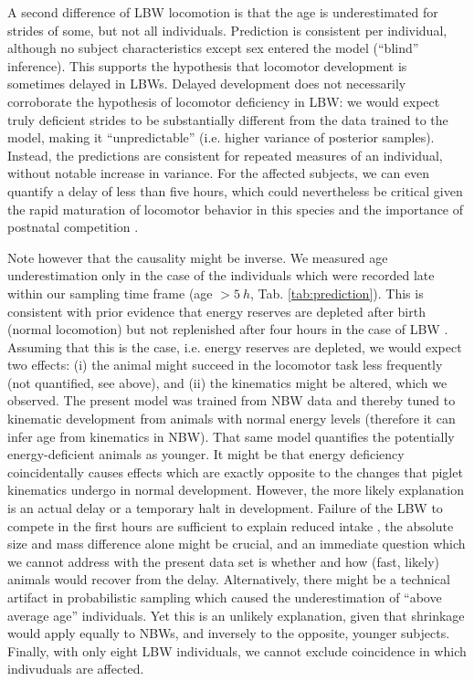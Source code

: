 A second difference of LBW locomotion is that the age is underestimated for strides of some, but not all individuals.
Prediction is consistent per individual, although no subject characteristics except sex entered the model (``blind'' inference).
This supports the hypothesis that locomotor development is sometimes delayed in LBWs.
Delayed development does not necessarily corroborate the hypothesis of locomotor deficiency in LBW: we would expect truly deficient strides to be substantially different from the data trained to the model, making it ``unpredictable'' (i.e. higher variance of posterior samples).
Instead, the predictions are consistent for repeated measures of an individual, without notable increase in variance.
For the affected subjects, we can even quantify a delay of less than five hours, which could nevertheless be critical given the rapid maturation of locomotor behavior in this species \citep{VandenHole2017} and the importance of postnatal competition \citep{Litten2003}.


Note however that the causality might be inverse.
We measured age underestimation only in the case of the individuals which were recorded late within our sampling time frame (age \(> 5\ h\), Tab. \ref{tab:prediction}).
This is consistent with prior evidence that energy reserves are depleted after birth (normal locomotion) but not replenished after four hours in the case of LBW \citep{LeDividich2017,VandenHole2019}.
Assuming that this is the case, i.e. energy reserves are depleted, we would expect two effects: (i) the animal might succeed in the locomotor task less frequently (not quantified, see above), and (ii) the kinematics might be altered, which we observed.
The present model was trained from NBW data and thereby tuned to kinematic development from animals with normal energy levels (therefore it can infer age from kinematics in NBW).
That same model quantifies the potentially energy-deficient animals as younger.
It might be that energy deficiency coincidentally causes effects which are exactly opposite to the changes that piglet kinematics undergo in normal development.
However, the more likely explanation is an actual delay or a temporary halt in development.
Failure of the LBW to compete in the first hours are sufficient to explain reduced intake \citep{Amdi2013}, the absolute size and mass difference alone might be crucial, and an immediate question which we cannot address with the present data set is whether and how (fast, likely) animals would recover from the delay.
Alternatively, there might be a technical artifact in probabilistic sampling \citep["shrinkage", \textit{cf.}][]{Gelman2013} which caused the underestimation of ``above average age'' individuals.
Yet this is an unlikely explanation, given that shrinkage would apply equally to NBWs, and inversely to the opposite, younger subjects.
Finally, with only eight LBW individuals, we cannot exclude coincidence in which indivuduals are affected.

